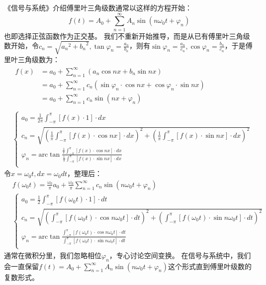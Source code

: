 《信号与系统》介绍傅里叶三角级数通常以这样的方程开始：
\[
f\left( t \right) =A_0+\sum_{n=1}^{\infty}{A_n\sin \left( n\omega _0t+\varphi _n \right)}
\]
也即选择正弦函数作为正交基。
我们不重新开始推导，而是从已有傅里叶三角级数开始，令$c_n=\sqrt{{a_n}^2+{b_n}^2},\tan \varphi _n=\frac{a_n}{b_n}$，则有$\sin \varphi _n=\frac{a_n}{c_n},\cos \varphi _n=\frac{b_n}{c_n}$，于是傅里叶三角级数为：
\begin{align*}
&\begin{aligned}
	f\left( x \right) &=a_0+\sum_{n=1}^{\infty}{\left( a_n\cos nx+b_n\sin nx \right)}\\
	&=a_0+\sum_{n=1}^{\infty}{c_n\left( \sin \varphi _n\cdot \cos nx+\cos \varphi _n\cdot \sin nx \right)}\\
	&=a_0+\sum_{n=1}^{\infty}{c_n\sin \left( nx+\varphi _n \right)}\\
\end{aligned} \\
&\begin{cases}
	a_0=\frac{1}{2\pi}\int_{-\pi}^{\pi}{\left[ f\left( x \right) \cdot 1 \right] \cdot dx}\\
	c_n=\sqrt{\left( \frac{1}{\pi}\int_{-\pi}^{\pi}{\left[ f\left( x \right) \cdot \cos nx \right] \cdot dx} \right) ^2+\left( \frac{1}{\pi}\int_{-\pi}^{\pi}{\left[ f\left( x \right) \cdot \sin nx \right] \cdot dx} \right) ^2}\\
	\varphi _n=\mathrm{arc}\tan \frac{\frac{1}{\pi}\int_{-\pi}^{\pi}{\left[ f\left( x \right) \cdot \cos nx \right] \cdot dx}}{\frac{1}{\pi}\int_{-\pi}^{\pi}{\left[ f\left( x \right) \cdot \sin nx \right] \cdot dx}}\\
\end{cases}
\end{align*}
令$x=\omega _0t,dx=\omega _0dt$，整理后：
\begin{align*}
&f\left( \omega _0t \right) =\frac{\omega _0}{\pi}a_0+\frac{\omega _0}{\pi}\sum_{n=1}^{\infty}{c_n\sin \left( n\omega _0t+\varphi _n \right)} \\
&\begin{cases}
	a_0=\frac{1}{2}\int_{-\pi}^{\pi}{\left[ f\left( \omega _0t \right) \cdot 1 \right] \cdot dt}\\
	c_n=\sqrt{\left( \int_{-\pi}^{\pi}{\left[ f\left( \omega _0t \right) \cdot \cos n\omega _0t \right] \cdot dt} \right) ^2+\left( \int_{-\pi}^{\pi}{\left[ f\left( \omega _0t \right) \cdot \sin n\omega _0t \right] \cdot dt} \right) ^2}\\
	\varphi _n=\mathrm{arc}\tan \frac{\int_{-\pi}^{\pi}{\left[ f\left( \omega _0t \right) \cdot \cos n\omega _0t \right] \cdot dt}}{\int_{-\pi}^{\pi}{\left[ f\left( \omega _0t \right) \cdot \sin n\omega _0t \right] \cdot dt}}\\
\end{cases}
\end{align*}
通常在微积分里，我们忽略相位$\varphi _n$，专心讨论空间变换。
在信号与系统中，我们会一直保留$f\left( t \right) =A_0+\sum_{n=1}^{\infty}{A_n\sin \left( n\omega _0t+\varphi _n \right)}$这个形式直到傅里叶级数的复数形式。

